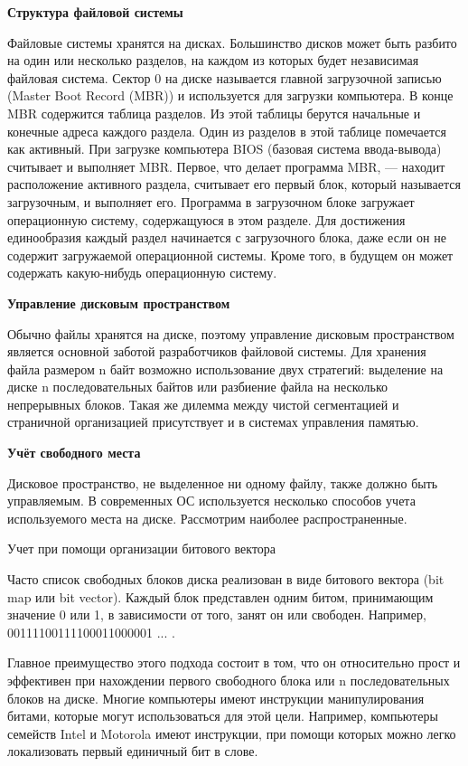 \begin{center}{\bfseries Структура файловой системы}
\end{center}

Файловые системы хранятся на дисках. Большинство дисков может быть разбито на один или несколько разделов, на каждом из которых будет независимая файловая система. Сектор 0 на диске называется главной загрузочной записью (Master Boot Record (MBR)) и используется для загрузки компьютера. В конце MBR содержится таблица разделов. Из этой таблицы берутся начальные и конечные адреса каждого раздела. Один из разделов в этой таблице помечается как активный. При загрузке компьютера BIOS (базовая система ввода-вывода) считывает и выполняет MBR. Первое, что делает программа MBR, — находит расположение активного раздела, считывает его первый блок, который называется загрузочным, и выполняет его. Программа в загрузочном блоке загружает операционную систему, содержащуюся в этом разделе. Для достижения единообразия каждый раздел начинается с загрузочного блока, даже если он не содержит загружаемой операционной системы. Кроме того, в будущем он может содержать какую-нибудь операционную систему.


\begin{center}{\bfseries Управление дисковым пространством}
\end{center}

Обычно файлы хранятся на диске, поэтому управление дисковым пространством является основной заботой разработчиков файловой системы. Для хранения файла размером n байт возможно использование двух стратегий: выделение на диске n последовательных байтов или разбиение файла на несколько непрерывных блоков. Такая же дилемма между чистой сегментацией и страничной организацией присутствует и в системах управления памятью.

\begin{center}{\bfseries Учёт свободного места}
\end{center}

Дисковое пространство, не выделенное ни одному файлу, также должно быть управляемым. В современных ОС используется несколько способов учета используемого места на диске. Рассмотрим наиболее распространенные.
\begin{way}
\begin{center}
  Учет при помощи организации битового вектора
\end{center}

Часто список свободных блоков диска реализован в виде битового вектора (bit map или bit vector). Каждый блок представлен одним битом, принимающим значение 0 или 1, в зависимости от того, занят он или свободен. Например, 00111100111100011000001 ... .
\end{way}
Главное преимущество этого подхода состоит в том, что он относительно прост и эффективен при нахождении первого свободного блока или n последовательных блоков на диске. Многие компьютеры имеют инструкции манипулирования битами, которые могут использоваться для этой цели. Например, компьютеры семейств Intel и Motorola имеют инструкции, при помощи которых можно легко локализовать первый единичный бит в слове.


